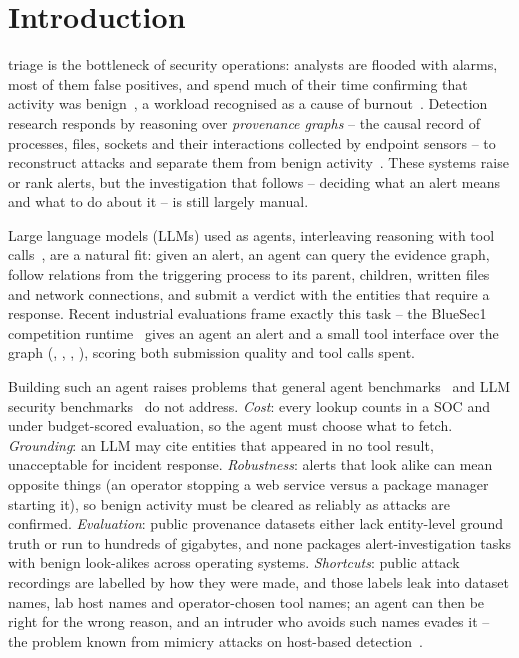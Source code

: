 \section{Introduction}
\label{sec:intro}

 triage is the bottleneck of security operations: analysts are flooded with alarms, most
of them false positives, and spend much of their time confirming that activity was
benign~\cite{alahmadi2022falsepositives,kokulu2019soc}, a workload recognised as a cause of
burnout~\cite{sundaramurthy2015burnout}. Detection research responds by reasoning over \emph{provenance graphs}
-- the causal record of processes, files, sockets and their interactions collected by endpoint sensors -- to
reconstruct attacks and separate them from benign
activity~\cite{hossain2017sleuth,milajerdi2019holmes,hassan2019nodoze,han2020unicorn,cheng2024kairos}. These
systems raise or rank alerts, but the investigation that follows -- deciding what an alert means and what to do
about it -- is still largely manual.

Large language models (LLMs) used as agents, interleaving reasoning with tool
calls~\cite{yao2023react,schick2023toolformer}, are a natural fit: given an alert, an agent can query the
evidence graph, follow relations from the triggering process to its parent, children, written files and network
connections, and submit a verdict with the entities that require a response. Recent industrial evaluations frame
exactly this task -- the BlueSec1 competition runtime~\cite{bluesec1_reference} gives an agent an alert and a
small tool interface over the graph (, , ,
), scoring both submission quality and tool calls spent.

Building such an agent raises problems that general agent benchmarks~\cite{liu2024agentbench,jimenez2024swebench}
and LLM security benchmarks~\cite{bhatt2023cyberseceval,alam2024ctibench,zhang2025cybench} do not address.
\emph{Cost}: every lookup counts in a SOC and under budget-scored evaluation, so the agent must choose what to
fetch. \emph{Grounding}: an LLM may cite entities that appeared in no tool result, unacceptable for incident
response. \emph{Robustness}: alerts that look alike can mean opposite things (an operator stopping a web service
versus a package manager starting it), so benign activity must be cleared as reliably as attacks are confirmed.
\emph{Evaluation}: public provenance datasets either lack entity-level ground truth or run to hundreds of
gigabytes, and none packages alert-investigation tasks with benign look-alikes across operating systems.
\emph{Shortcuts}: public attack recordings are labelled by how they were made, and those labels leak into dataset
names, lab host names and operator-chosen tool names; an agent can then be right for the wrong reason, and an
intruder who avoids such names evades it -- the problem known from mimicry attacks on host-based
detection~\cite{wagner2002mimicry,goyal2023mimicry}.

